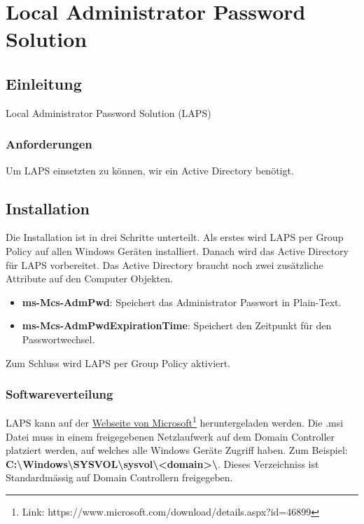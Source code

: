 \chapter{Local Administrator Password Solution}
\section{Einleitung}
Local Administrator Password Solution (LAPS)

\subsection{Anforderungen}
Um LAPS einsetzten zu können, wir ein Active Directory benötigt.



\section{Installation}
Die Installation ist in drei Schritte unterteilt.
Als erstes wird LAPS per Group Policy auf allen Windows Geräten installiert.
Danach wird das Active Directory für LAPS vorbereitet.
Das Active Directory braucht noch zwei zusätzliche Attribute auf den Computer Objekten. 
\begin{itemize}
    \item \textbf{ms-Mcs-AdmPwd}: Speichert das Administrator Passwort in Plain-Text.
    \item \textbf{ms-Mcs-AdmPwdExpirationTime}: Speichert den Zeitpunkt für den Passwortwechsel.
\end{itemize}

Zum Schluss wird LAPS per Group Policy aktiviert.


\subsection{Softwareverteilung}
LAPS kann auf der \href{https://www.microsoft.com/download/details.aspx?id=46899}{Webseite von Microsoft}\footnote{Link: https://www.microsoft.com/download/details.aspx?id=46899} heruntergeladen werden.
Die .msi Datei muss in einem freigegebenen Netzlaufwerk auf dem Domain Controller platziert werden, auf welches alle Windows Geräte Zugriff haben.
Zum Beispiel: \textbf{C:\textbackslash Windows\textbackslash SYSVOL\textbackslash sysvol\textbackslash <domain>\textbackslash}. 
Dieses Verzeichniss ist Standardmässig auf Domain Controllern freigegeben.\\


